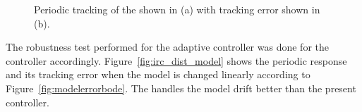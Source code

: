 \begin{figure}[h!]
  \centering %
  \qquad
  \caption{\label{fig:irc_tracking} Periodic tracking of the \abbrIRC shown in (a) with tracking error shown in (b).}
\end{figure}

The robustness test performed for the adaptive controller was done for the \abbrIRC controller accordingly. Figure~\ref{fig:irc_dist_model} shows the periodic response and its tracking error when the model is changed linearly according to Figure~\ref{fig:modelerrorbode}. The \abbrIRC handles the model drift better than the present controller.

